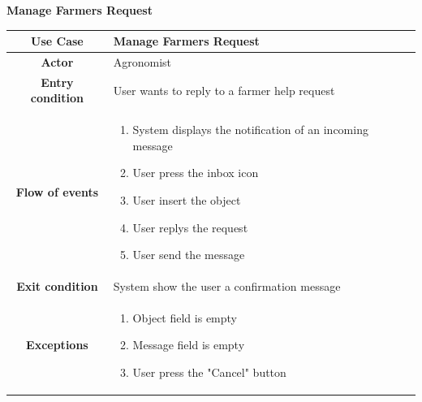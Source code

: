 \documentclass[table, 12pt]{article}
\begin{document}
\begin{itemize}
            \begin{table}[H]
                \item[] \textbf{Manage Farmers Request}
                \item[] 
                \centering
                \begin{tabular}{|c| m{}|}
                    \hline
                    \textbf{Use Case} & Manage Farmers Request\\ \hline
                    \textbf{Actor} & Agronomist\\ \hline
                    \textbf{Entry condition} & User wants to reply to a farmer help request\\  \hline
                    \textbf{Flow of events} & \begin{enumerate}
                                                \item System displays the notification of an incoming message
                                                \item User press the inbox icon
                                                \item User insert the object
                                                \item User replys the request
                                                \item User send the message
                                            \end{enumerate}\\ \hline
                    \textbf{Exit condition} & System show the user a confirmation message\\ \hline
                    \textbf{Exceptions} &  \begin{enumerate}
                        \item Object field is empty
                        \item Message field is empty 
                        \item User press the "Cancel" button    
                    \end{enumerate}\\ \hline                    
                \end{tabular}
            \end{table}


\end{itemize}
\end{document}
